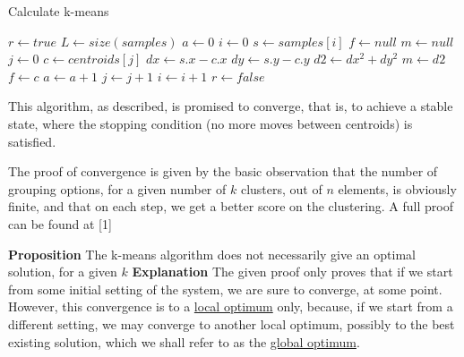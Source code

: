 \documentclass[12pt]{article}
\begin{document}
\begin{algorithm}
\caption{Calculate k-means}
\begin{algorithmic} 
\REQUIRE 
\ENSURE 
\STATE $r \leftarrow true$
\newline
\STATE $L \leftarrow size(samples)$
\newline
{}
\STATE $a \leftarrow 0$
\newline
\STATE $i \leftarrow 0$
\STATE $s \leftarrow samples[i]$
\newline
\STATE $f \leftarrow null$
\STATE $m \leftarrow null$
\newline
\STATE $j \leftarrow 0$
\STATE $c \leftarrow centroids[j]$
\newline
\STATE $dx \leftarrow s.x - c.x$
\STATE $dy \leftarrow s.y - c.y$
\STATE $d2 \leftarrow dx^2+dy^2$
\newline
{}
\STATE $m \leftarrow d2$
\STATE $f \leftarrow c$
\ENDIF
\newline
{}
\STATE $a \leftarrow a+1$
\ENDIF
\newline
\STATE $j \leftarrow j+1$
\ENDWHILE
\newline
\STATE $i \leftarrow i+1$
\ENDWHILE
\newline
{}
\STATE $r \leftarrow false$
\ENDIF
\newline
\ENDWHILE
\end{algorithmic}
\end{algorithm}

\newpage

This algorithm, as described, is promised to converge, that is, to achieve a stable state, where the stopping condition (no more moves between centroids) is satisfied.

The proof of convergence is given by the basic observation that the number of grouping options, for a given number of \( k \) clusters, out of \(n \) elements, is obviously finite, and that on each step, we get a better score on the clustering.
A full proof can be found at [1] \newline

\textbf{Proposition} The k-means algorithm does not necessarily give an optimal solution, for a given \( k \)\newline
\textbf{Explanation} The given proof only proves that if we start from some initial setting of the system, we are sure to converge, at some point. However, this convergence is to a \underline{local optimum} only, because, if we start from a different setting, we may converge to another local optimum, possibly to the best existing solution, which we shall refer to as the \underline{global optimum}. \newline
\end{document}
